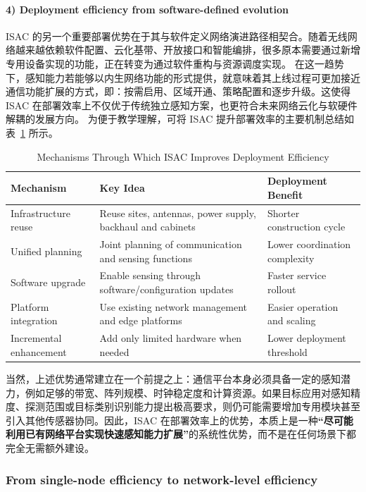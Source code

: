 \paragraph{4) Deployment efficiency from software-defined evolution}
ISAC 的另一个重要部署优势在于其与软件定义网络演进路径相契合。随着无线网络越来越依赖软件配置、云化基带、开放接口和智能编排，很多原本需要通过新增专用设备实现的功能，正在转变为通过软件重构与资源调度实现\cite{Andrews2014,Letaief2019Roadmap}。  
在这一趋势下，感知能力若能够以内生网络功能的形式提供，就意味着其上线过程可更加接近通信功能扩展的方式，即：按需启用、区域开通、策略配置和逐步升级。这使得 ISAC 在部署效率上不仅优于传统独立感知方案，也更符合未来网络云化与软硬件解耦的发展方向。
为便于教学理解，可将 ISAC 提升部署效率的主要机制总结如表~\ref{tab:isac-deployment-mechanism} 所示。
\begin{table}[htbp]
\centering
\caption{Mechanisms Through Which ISAC Improves Deployment Efficiency}
\label{tab:isac-deployment-mechanism}
\begin{tabular}{p{3.5cm}p{5.0cm}p{4.8cm}}
\hline
\textbf{Mechanism} & \textbf{Key Idea} & \textbf{Deployment Benefit} \\
\hline
Infrastructure reuse & Reuse sites, antennas, power supply, backhaul and cabinets & Shorter construction cycle \\
Unified planning & Joint planning of communication and sensing functions & Lower coordination complexity \\
Software upgrade & Enable sensing through software/configuration updates & Faster service rollout \\
Platform integration & Use existing network management and edge platforms & Easier operation and scaling \\
Incremental enhancement & Add only limited hardware when needed & Lower deployment threshold \\
\hline
\end{tabular}
\end{table}

当然，上述优势通常建立在一个前提之上：通信平台本身必须具备一定的感知潜力，例如足够的带宽、阵列规模、时钟稳定度和计算资源。如果目标应用对感知精度、探测范围或目标类别识别能力提出极高要求，则仍可能需要增加专用模块甚至引入其他传感器协同。因此，ISAC 在部署效率上的优势，本质上是一种\textbf{“尽可能利用已有网络平台实现快速感知能力扩展”}的系统性优势，而不是在任何场景下都完全无需额外建设。

\subsubsection{From single-node efficiency to network-level efficiency}
\label{subsubsec:ch1-isac-core value-deployment-network}


